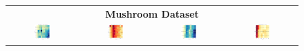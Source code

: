 \begin{figure}[H]
{\begin{tabular}{cccc}
			\multicolumn{4}{c}{\textbf{Mushroom Dataset}} \\ 
			\includegraphics[width=0.23\textwidth]{figures/FuzzyCMeans/Mushroom/Time_Heatmap_n_clusters_vs_fuzziness.png} &
			\includegraphics[width=0.23\textwidth]{figures/FuzzyCMeans/Mushroom/Metric_Heatmap_fuzziness_vs_n_clusters.png} &
			\includegraphics[width=0.23\textwidth]{figures/FuzzyCMeans/Mushroom/Time_Heatmap_n_clusters_vs_rho.png} &
			\includegraphics[width=0.23\textwidth]{figures/FuzzyCMeans/Mushroom/Metric_Heatmap_rho_vs_fuzziness.png} \\[1em]
			

\end{tabular}}
\end{figure}
